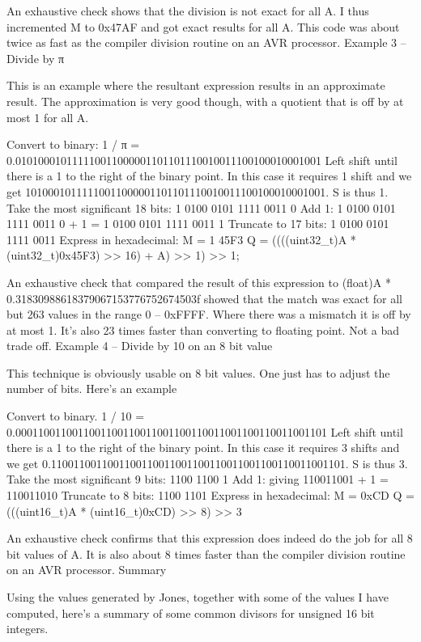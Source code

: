 {{{{{{{{{{An exhaustive check shows that the division is not exact for all A. I thus incremented M to 0x47AF and got exact results for all A. This code was about twice as fast as the compiler division routine on an AVR processor.
Example 3 – Divide by π

This is an example where the resultant expression results in an approximate result. The approximation is very good though, with a quotient that is off by at most 1 for all A.

    Convert to binary: 1 / π = 0.010100010111110011000001101101110010011100100010001001
    Left shift until there is a 1 to the right of the binary point. In this case it requires 1 shift and we get
    10100010111110011000001101101110010011100100010001001. S is thus 1.
    Take the most significant 18 bits: 1 0100 0101 1111 0011 0
    Add 1: 1 0100 0101 1111 0011 0 + 1 = 1 0100 0101 1111 0011 1
    Truncate to 17 bits: 1 0100 0101 1111 0011
    Express in hexadecimal: M = 1 45F3
    Q = ((((uint32_t)A * (uint32_t)0x45F3) >> 16) + A) >> 1) >> 1;

An exhaustive check that compared the result of this expression to (float)A * 0.31830988618379067153776752674503f showed that the match was exact for all but 263 values in the range 0 – 0xFFFF. Where there was a mismatch it is off by at most 1. It’s also 23 times faster than converting to floating point. Not a bad trade off.
Example 4 – Divide by 10 on an 8 bit value

This technique is obviously usable on 8 bit values. One just has to adjust the number of bits. Here’s an example

    Convert to binary. 1 / 10 = 0.0001100110011001100110011001100110011001100110011001101
    Left shift until there is a 1 to the right of the binary point. In this case it requires 3 shifts and we get 0.1100110011001100110011001100110011001100110011001101. S is thus 3.
    Take the most significant 9 bits: 1100 1100 1
    Add 1: giving 110011001 + 1 = 110011010
    Truncate to 8 bits: 1100 1101
    Express in hexadecimal: M = 0xCD
    Q = (((uint16_t)A * (uint16_t)0xCD) >> 8) >> 3

An exhaustive check confirms that this expression does indeed do the job for all 8 bit values of A. It is also about 8 times faster than the compiler division routine on an AVR processor.
Summary

Using the values generated by Jones, together with some of the values I have computed, here’s a summary of some common divisors for unsigned 16 bit integers.

}}}}}}}}}}
